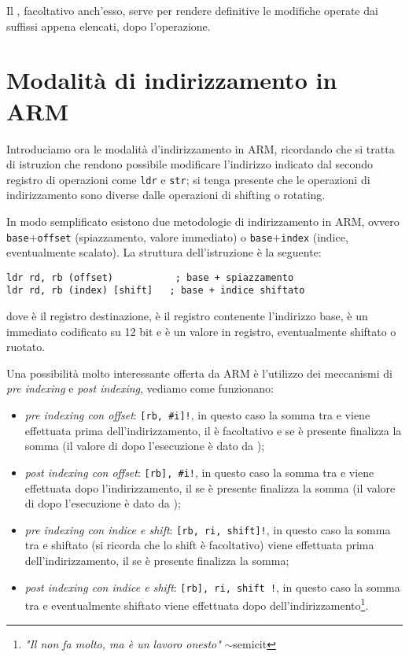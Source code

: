 \documentclass[class=book, crop=false, oneside]{standalone}
\begin{document}
Il \suffix{!}, facoltativo anch'esso, serve per rendere definitive le modifiche operate dai suffissi appena elencati, dopo l'operazione.

\section{Modalità di indirizzamento in ARM}
Introduciamo ora le modalità d'indirizzamento in ARM, ricordando che si tratta di istruzion che rendono possibile modificare l'indirizzo indicato dal secondo registro di operazioni come \texttt{ldr} e \texttt{str}; si tenga presente che le operazioni di indirizzamento sono diverse dalle operazioni di shifting o rotating.

In modo semplificato esistono due metodologie di indirizzamento in ARM, ovvero \texttt{base}\(+\)\texttt{offset} (spiazzamento, valore immediato) o \texttt{base}\(+\)\texttt{index} (indice, eventualmente scalato). La struttura dell'istruzione è la seguente:

\begin{verbatim}
ldr rd, rb (offset)           ; base + spiazzamento
ldr rd, rb (index) [shift]   ; base + indice shiftato
\end{verbatim}
dove  è il registro destinazione,  è il registro contenente l'indirizzo base,  è un immediato codificato su 12 bit e  è un valore in registro, eventualmente shiftato o ruotato.

Una possibilità molto interessante offerta da ARM è l'utilizzo dei meccanismi di \emph{pre indexing} e \emph{post indexing}, vediamo come funzionano:

\begin{itemize}
	\item \emph{pre indexing con offset}: \texttt{[rb, \#i]!}, in questo caso la somma tra  e  viene  effettuata prima dell'indirizzamento, il \register{!} è facoltativo e se è presente finalizza la somma (il valore di  dopo l'esecuzione è dato da );
	\item \emph{post indexing con offset}: \texttt{[rb], \#i!}, in questo caso la somma tra  e  viene effettuata dopo l'indirizzamento, il \suffix{!} se è presente finalizza la somma (il valore di  dopo l'esecuzione è dato da );
	\item \emph{pre indexing con indice e shift}: \texttt{[rb, ri, shift]!}, in questo caso la somma tra  e  shiftato (si ricorda che lo shift è facoltativo) viene  effettuata prima dell'indirizzamento, il \suffix{!} se è presente finalizza la somma;
	\item \emph{post indexing con indice e shift}: \texttt{[rb], ri, shift !}, in questo caso la somma tra  e  eventualmente shiftato viene effettuata dopo dell'indirizzamento\footnote{\emph{"Il \suffix{!} non fa molto, ma è un lavoro onesto"} \(\sim\)semicit}.
\end{itemize}
\end{document}
